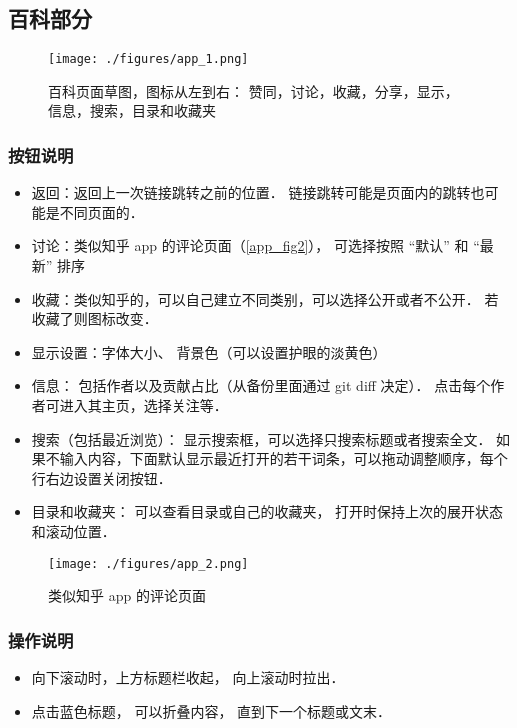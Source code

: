 
\subsection{百科部分}
\begin{figure}[ht]
\centering
\texttt{[image: ./figures/app\_1.png]}
\caption{百科页面草图，图标从左到右： 赞同，讨论，收藏，分享，显示，信息，搜索，目录和收藏夹}\label{app_fig1}
\end{figure}

\subsubsection{按钮说明}
\begin{itemize}
\item 返回：返回上一次链接跳转之前的位置． 链接跳转可能是页面内的跳转也可能是不同页面的．
\item 讨论：类似知乎 app 的评论页面（\autoref{app_fig2}）， 可选择按照 “默认” 和 “最新” 排序
\item 收藏：类似知乎的，可以自己建立不同类别，可以选择公开或者不公开． 若收藏了则图标改变．
\item 显示设置：字体大小、 背景色（可以设置护眼的淡黄色）
\item 信息： 包括作者以及贡献占比（从备份里面通过 git diff 决定）． 点击每个作者可进入其主页，选择关注等．
\item 搜索（包括最近浏览）： 显示搜索框，可以选择只搜索标题或者搜索全文． 如果不输入内容，下面默认显示最近打开的若干词条，可以拖动调整顺序，每个行右边设置关闭按钮．
\item 目录和收藏夹： 可以查看目录或自己的收藏夹， 打开时保持上次的展开状态和滚动位置．
\end{itemize}

\begin{figure}[ht]
\centering
\texttt{[image: ./figures/app\_2.png]}
\caption{类似知乎 app 的评论页面} \label{app_fig2}
\end{figure}

\subsubsection{操作说明}
\begin{itemize}
\item 向下滚动时，上方标题栏收起， 向上滚动时拉出．
\item 点击蓝色标题， 可以折叠内容， 直到下一个标题或文末．
\end{itemize}
